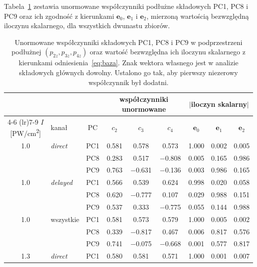 \documentclass[12pt,a4paper]{article}
\newcommand{\PWcm}{PW/cm\textsuperscript{2}}
\begin{document}
Tabela~\ref{tab:pca} zestawia unormowane współczynniki podłużne
składowych PC1, PC8 i PC9 oraz ich zgodność z kierunkami
$\mathbf{e}_0$, $\mathbf{e}_1$ i $\mathbf{e}_2$, mierzoną wartością
bezwzględną iloczynu skalarnego, dla wszystkich dwunastu zbiorów.

\begin{table}[!h]
\centering
\footnotesize
\setlength{\tabcolsep}{4pt}
\caption{Unormowane współczynniki składowych PC1, PC8 i PC9 w
podprzestrzeni podłużnej $(p_{2z},p_{3z},p_{4z})$ oraz wartość
bezwzględna ich iloczynu skalarnego z kierunkami
odniesienia~\eqref{eq:baza}. Znak wektora własnego jest w analizie
składowych głównych dowolny. Ustalono go tak, aby pierwszy niezerowy
współczynnik był dodatni.}
\label{tab:pca}
\begin{tabular}{c l c ccc ccc}
\toprule
& & & \multicolumn{3}{c}{współczynniki unormowane}
    & \multicolumn{3}{c}{$|$iloczyn skalarny$|$} \\
\cmidrule(lr){4-6}
\cmidrule(lr){7-9}
$I$ [\PWcm] & kanał & PC & $c_2$ & $c_3$ & $c_4$
& $\mathbf{e}_0$ & $\mathbf{e}_1$ & $\mathbf{e}_2$ \\
\midrule
\num{1.0} & \emph{direct} & PC1 & \num{0.581} & \num{0.578} & \num{0.573} & \num{1.000} & \num{0.002} & \num{0.005} \\
 &  & PC8 & \num{0.283} & \num{0.517} & \num{-0.808} & \num{0.005} & \num{0.165} & \num{0.986} \\
 &  & PC9 & \num{0.763} & \num{-0.631} & \num{-0.136} & \num{0.003} & \num{0.986} & \num{0.165} \\
\midrule
\num{1.0} & \emph{delayed} & PC1 & \num{0.566} & \num{0.539} & \num{0.624} & \num{0.998} & \num{0.020} & \num{0.058} \\
 &  & PC8 & \num{0.620} & \num{-0.777} & \num{0.107} & \num{0.029} & \num{0.988} & \num{0.151} \\
 &  & PC9 & \num{0.537} & \num{0.333} & \num{-0.775} & \num{0.055} & \num{0.144} & \num{0.988} \\
\midrule
\num{1.0} & wszystkie & PC1 & \num{0.581} & \num{0.573} & \num{0.579} & \num{1.000} & \num{0.005} & \num{0.002} \\
 &  & PC8 & \num{0.339} & \num{-0.817} & \num{0.467} & \num{0.006} & \num{0.817} & \num{0.576} \\
 &  & PC9 & \num{0.741} & \num{-0.075} & \num{-0.668} & \num{0.001} & \num{0.577} & \num{0.817} \\
\midrule
\num{1.3} & \emph{direct} & PC1 & \num{0.580} & \num{0.581} & \num{0.571} & \num{1.000} & \num{0.001} & \num{0.007} \\

\end{tabular}
\end{table}
\end{document}
